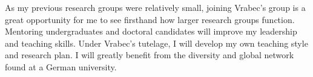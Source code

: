 \documentclass[12pt]{article}
\begin{document}
As my previous research groups were relatively small, joining Vrabec's group is a great opportunity for me to see firsthand how larger research groups function. Mentoring undergraduates and doctoral candidates will improve my leadership and teaching skills. Under Vrabec's tutelage, I will develop my own teaching style and research plan. I will greatly benefit from the diversity and global network found at a German university.
		
		

	
	
	  
	
	
	 

  

%	
%	
\end{document}
